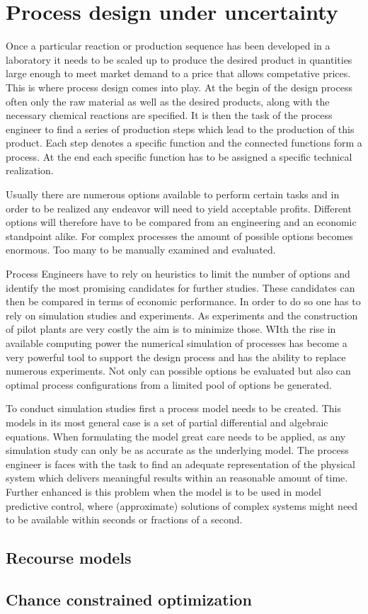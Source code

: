 \chapter{Process design under uncertainty}
\label{chp:ProcessDesign}

Once a particular reaction or production sequence has been developed in a laboratory it needs to be scaled 
up to produce the desired product in quantities large enough to meet market demand to a price that allows 
competative prices. This is where process design comes into play. At the begin of the design process often 
only the raw material as well as the desired products, along with the necessary chemical reactions are 
specified. It is then the task of the process engineer to find a series of production steps which lead to the 
production of this product. Each step denotes a specific function and the connected functions form a process.
 At the end each specific function has to be assigned a specific technical realization. 

Usually there are numerous options available to perform certain tasks and in order to be realized any 
endeavor will need to yield acceptable profits. Different options will therefore have to be compared  from an 
engineering and an economic standpoint alike. For complex processes the amount of possible options 
becomes enormous. Too many to be manually examined and evaluated. 

Process Engineers have to rely on heuristics to limit the number of options and identify the most promising 
candidates for further studies. These candidates can then be compared in terms of economic performance. 
In order to do so one has to rely on simulation studies and experiments. As experiments and the construction 
of pilot plants are very costly the aim is to minimize those. WIth the rise in available computing power the 
numerical simulation of processes has become a very powerful tool to support the design process and has 
the ability to replace numerous experiments. Not only can possible options be evaluated but also can 
optimal process configurations from a limited pool of options be generated. 

To conduct simulation studies first a process model needs to be created. This models in its most general 
case is a set of partial differential and algebraic equations. When formulating the model great care needs 
to be applied, as any simulation study can only be as accurate as the underlying model. The process 
engineer is faces with the task to find an adequate representation of the physical system which delivers 
meaningful results within an reasonable amount of time. Further enhanced is this problem when the model 
is to be used in model predictive control, where (approximate) solutions of complex systems might need to 
be available within seconds or fractions of a second. 


\section{Recourse models}
\label{sec:des:recourse}


\section{Chance constrained optimization}
\label{sec:des:ChanceConstrained}